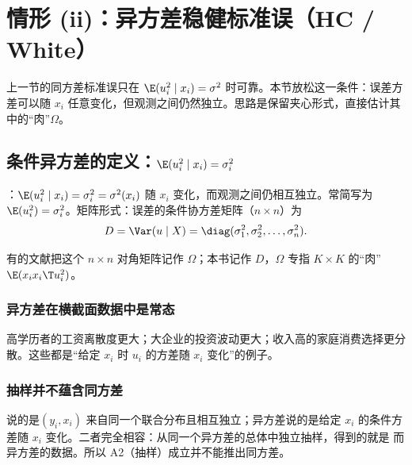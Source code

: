 \section{情形 (ii)：异方差稳健标准误（HC / White）}\label{sec:U05b-hc}

上一节的同方差标准误只在 $\E(u_i^2\mid x_i)=\sigma^2$ 时可靠。本节放松这一条件：误差方差可以随 $x_i$ 任意变化，但观测之间仍然独立。思路是保留夹心形式，直接估计其中的“肉”$\Omega$。

\subsection{条件异方差的定义：\texorpdfstring{$\E(u_i^2\mid x_i)=\sigma_i^2$}{E(u2|x) = sigma\_i2}}

\begin{defn}[条件异方差]\label{def:U05b-hetero}
：$\E(u_i^2\mid x_i)=\sigma_i^2=\sigma^2(x_i)$ 随 $x_i$ 变化，而观测之间仍相互独立。常简写为 $\E(u_i^2)=\sigma_i^2$。矩阵形式：误差的条件协方差矩阵（$n\times n$）为
\[
D=\Var(u\mid X)=\diag(\sigma_1^2,\sigma_2^2,\dots,\sigma_n^2).
\]
\end{defn}

有的文献把这个 $n\times n$ 对角矩阵记作 $\Omega$；本书记作 $D$，$\Omega$ 专指 $K\times K$ 的“肉”$\E(x_ix_i\T u_i^2)$。

\subsubsection{异方差在横截面数据中是常态}

高学历者的工资离散度更大；大企业的投资波动更大；收入高的家庭消费选择更分散。这些都是“给定 $x_i$ 时 $u_i$ 的方差随 $x_i$ 变化”的例子。

\subsubsection{\texorpdfstring{\iid}{i.i.d.} 抽样并不蕴含同方差}

\iid 说的是$(y_i,x_i)$ 来自同一个联合分布且相互独立；异方差说的是给定 $x_i$ 的条件方差随 $x_i$ 变化。二者完全相容：从同一个异方差的总体中独立抽样，得到的就是 \iid 而异方差的数据。所以 A2（\iid 抽样）成立并不能推出同方差。

